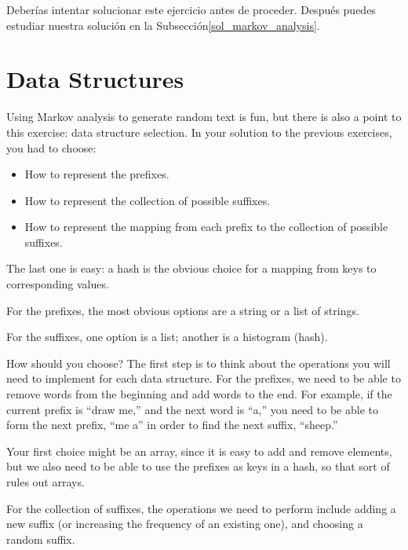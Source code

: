 Deberías intentar solucionar este ejercicio antes de proceder. 
Después puedes estudiar nuestra solución en la Subsección\ref{sol_markov_analysis}.


\section{Data Structures}

Using Markov analysis to generate random text is fun, but there is
also a point to this exercise: data structure selection.  In your
solution to the previous exercises, you had to choose:

\begin{itemize}

\item How to represent the prefixes.

\item How to represent the collection of possible suffixes.

\item How to represent the mapping from each prefix to
the collection of possible suffixes.

\end{itemize}

The last one is easy: a hash is the obvious choice
for a mapping from keys to corresponding values.

For the prefixes, the most obvious options are a string or
a list of strings.

For the suffixes,
one option is a list; another is a histogram (hash).

How should you choose?  The first step is to think about
the operations you will need to implement for each data structure.
For the prefixes, we need to be able to remove words from
the beginning and add words to the end.  For example, if the current
prefix is ``draw me,'' and the next word is ``a,'' you need
to be able to form the next prefix, ``me a'' in order to find 
the next suffix, ``sheep.''

Your first choice might be an array, since it is easy to add
and remove elements, but we also need to be able to use the
prefixes as keys in a hash, so that sort of rules out arrays.

For the collection of suffixes, the operations we need to
perform include adding a new suffix (or increasing the frequency
of an existing one), and choosing a random suffix.

